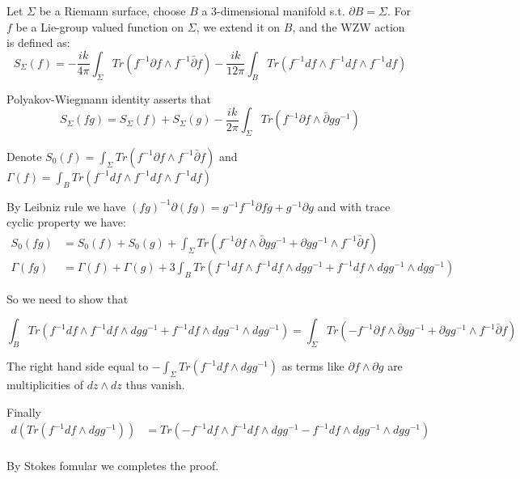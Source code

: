 Let $\Sigma$ be a Riemann surface, choose $B$ a 3-dimensional manifold s.t. $\partial B=\Sigma$. For $f$ be a Lie-group valued function on $\Sigma$, we extend it on $B$, and the WZW action is defined as:
$$S_\Sigma(f)=-\frac{ik}{4\pi}\int_{\Sigma}Tr(f^{-1}\partial f\wedge f^{-1}\bar\partial f)
-\frac{ik}{12\pi}\int_{B}Tr(f^{-1}df\wedge f^{-1}df\wedge f^{-1}df)$$

Polyakov-Wiegmann identity asserts that 
$$S_\Sigma(fg)=S_\Sigma(f)+S_\Sigma(g)-\frac{ik}{2\pi}\int_{\Sigma}Tr(f^{-1}\partial f\wedge \bar\partial g g^{-1})$$

Denote $S_0(f)=\int_{\Sigma}Tr(f^{-1}\partial f\wedge f^{-1}\bar\partial f)$ and $\Gamma(f)=\int_{B}Tr(f^{-1}df\wedge f^{-1}df\wedge f^{-1}df)$

By Leibniz rule we have $(fg)^{-1}\partial(fg)=g^{-1}f^{-1}\partial fg+g^{-1}\partial g$ and with trace cyclic property we have: 
\begin{align*}
    S_0(fg)&=S_0(f)+S_0(g)+\int_{\Sigma}Tr(f^{-1}\partial f\wedge \bar\partial g g^{-1}+\partial g g^{-1}\wedge f^{-1}\bar \partial f)\\
    \Gamma(fg)&=\Gamma(f)+\Gamma(g)+3\int_{B}Tr(f^{-1}df\wedge f^{-1}df\wedge dgg^{-1}+f^{-1}df\wedge dgg^{-1}\wedge dgg^{-1})
\end{align*}

So we need to show that 

$$\int_{B}Tr(f^{-1}df\wedge f^{-1}df\wedge dgg^{-1}+f^{-1}df\wedge dgg^{-1}\wedge dgg^{-1})=\int_{\Sigma}Tr(-f^{-1}\partial f\wedge \bar\partial g g^{-1}+\partial g g^{-1}\wedge f^{-1}\bar \partial f)$$

The right hand side equal to $-\int_{\Sigma}Tr(f^{-1}d f\wedge d g g^{-1})$ as terms like $\partial f \wedge \partial g$ are multiplicities of $dz\wedge dz$ thus vanish.

Finally 
\begin{align*}
    d(Tr(f^{-1}d f\wedge d g g^{-1}))&=Tr(-f^{-1}d f\wedge f^{-1}d f\wedge d g g^{-1}-f^{-1}d f\wedge d g g^{-1} \wedge d g g^{-1})\\
\end{align*}

By Stokes fomular we completes the proof.
